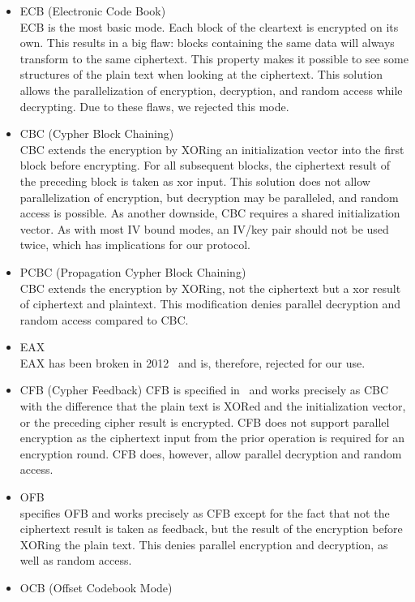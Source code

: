 \begin{itemize}
	\item ECB (Electronic Code Book)\\
	ECB is the most basic mode. Each block of the cleartext is encrypted on its own. This results in a big flaw: blocks containing the same data will always transform to the same ciphertext. This property makes it possible to see some structures of the plain text when looking at the ciphertext. This solution allows the parallelization of encryption, decryption, and random access while decrypting. Due to these flaws, we rejected this mode.
	\item CBC (Cypher Block Chaining)\\  
	CBC extends the encryption by XORing an initialization vector into the first block before encrypting. For all subsequent blocks, the ciphertext result of the preceding block is taken as xor input. This solution does not allow parallelization of encryption, but decryption may be paralleled, and random access is possible. As another downside, CBC requires a shared initialization vector. As with most IV bound modes, an IV/key pair should not be used twice, which has implications for our protocol.
	\item PCBC (Propagation Cypher Block Chaining)\\
	CBC extends the encryption by XORing, not the ciphertext but a xor result of ciphertext and plaintext. This modification denies parallel decryption and random access compared to CBC.
	\item EAX\\      
	EAX has been broken in 2012~\cite{minematsu2013attacks} and is, therefore, rejected for our use.
	\item CFB (Cypher Feedback)
	CFB is specified in~\cite{dworkin2001recommendation} and works precisely as CBC with the difference that the plain text is XORed and the initialization vector, or the preceding cipher result is encrypted. CFB does not support parallel encryption as the ciphertext input from the prior operation is required for an encryption round. CFB does, however, allow parallel decryption and random access.
	\item OFB\\
	\cite{dworkin2001recommendation} specifies OFB and works precisely as CFB except for the fact that not the ciphertext result is taken as feedback, but the result of the encryption before XORing the plain text. This denies parallel encryption and decryption, as well as random access.
	\item OCB (Offset Codebook Mode)\\

\end{itemize}
